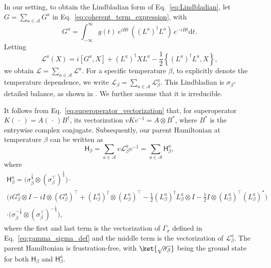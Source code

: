 \documentclass{article}
\theoremstyle{plain}
\theoremstyle{plain}
\theoremstyle{plain}
\theoremstyle{plain}
\theoremstyle{plain}
\theoremstyle{plain}
\theoremstyle{plain}
\newcommand{\dd}{\mathrm{d}}
\newcommand{\mathplaceholder}{\,\cdot\,}
\newcommand{\intinf}{\int_{-\infty}^\infty}
\newcommand{\calA}{\ensuremath{\mathcal{A}}}
\newcommand{\calL}{\ensuremath{\mathcal{L}}}
\newcommand{\sfH}{\ensuremath{\mathsf{H}}}
\begin{document}
In our setting, to obtain the Lindbladian form of Eq.~\eqref{eq:Lindbladian}, let $G = \sum_{a\in\calA} G^a$ in Eq.~\eqref{eq:coherent_term_expression}, 
with 
\begin{equation}
    G^a = \intinf g(t) \: e^{iHt} \, ((L^a)^\dag L^a) \, e^{-iHt} \dd t.
\end{equation}
Letting
\begin{equation}
    \calL^a(X) = i[G^a, X] + (L^a)^\dag X L^a - \frac{1}{2} \left\{ (L^a)^\dag L^a, X \right\},
\end{equation} we obtain 
$\calL = \sum_{a\in\calA} \calL^a$. For a specific temperature $\beta$, to explicitly denote the temperature dependence, we write $\calL_\beta = \sum_{a\in\calA} \calL_\beta^a$.
This Lindbladian is $\sigma_\beta$-detailed balance, as shown in \cite{Ding2025EfficientQuantumGibbs}. We further assume that it is irreducible.

It follows from Eq.~\eqref{eq:superoperator_vectorization} that, for superoperator $K(\mathplaceholder) = A (\mathplaceholder) B^\dagger$, its vectorization $vKv^{-1} = A \otimes B^*$, where $B^*$ is the entrywise complex conjugate. 
Subsequently, our parent Hamiltonian at temperature $\beta$ can be written as 
\begin{equation}
    \sfH_\beta = \sum_{a\in\calA} v \calL_\beta^a v^{-1} = \sum_{a\in\calA} \sfH_{\beta}^a,
\end{equation}
where
\begin{multline}
    \sfH_{\beta}^a = \Big (\sigma_\beta^{\frac{1}{4}} \otimes (\sigma_\beta^\top)^{\frac{1}{4}} \Big) \cdot \\ 
    \Big ( 
        iG_{\beta}^a \otimes I - iI \otimes (G_{\beta}^a)^\top + (L_\beta^a)^\dag \otimes (L_{\beta}^a)^\top - \frac{1}{2} (L_{\beta}^a)^\dag L_{\beta}^a \otimes I - \frac{1}{2} I \otimes (L_{\beta}^a)^\top (L_{\beta}^a)^* \Big) \\
    \cdot\Big( \sigma_\beta^{-\frac{1}{4}} \otimes (\sigma_\beta^\top)^{-\frac{1}{4}} \Big),
\end{multline}
where the first and last term is the vectorization of $\Gamma_\sigma$ defined in Eq.~\eqref{eq:gamma_sigma_def} and the middle term is the vectorization of $\calL_{\beta}^a$. The parent Hamiltonian is frustration-free, with $\ket{\sqrt{\sigma_\beta}}$ being the ground state for both $\sfH_\beta$ and $\sfH_\beta^a$.
\end{document}
